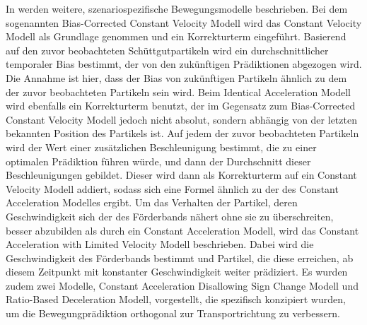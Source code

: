 In \cite{Pfaff2018} werden weitere, szenariospezifische Bewegungsmodelle beschrieben.
Bei dem sogenannten Bias-Corrected Constant Velocity Modell wird das Constant Velocity Modell als Grundlage genommen und ein Korrekturterm eingeführt.
Basierend auf den zuvor beobachteten Schüttgutpartikeln wird ein durchschnittlicher temporaler Bias bestimmt, der von den zukünftigen Prädiktionen abgezogen wird.
Die Annahme ist hier, dass der Bias von zukünftigen Partikeln ähnlich zu dem der zuvor beobachteten Partikeln sein wird.
Beim Identical Acceleration Modell wird ebenfalls ein Korrekturterm benutzt, 
der im Gegensatz zum Bias-Corrected Constant Velocity Modell jedoch nicht absolut, sondern abhängig von der letzten bekannten Position des Partikels ist.
Auf jedem der zuvor beobachteten Partikeln wird der Wert einer zusätzlichen Beschleunigung bestimmt, die zu einer optimalen Prädiktion führen würde,
und dann der Durchschnitt dieser Beschleunigungen gebildet.
Dieser wird dann als Korrekturterm auf ein Constant Velocity Modell addiert, sodass sich eine Formel ähnlich zu der des Constant Acceleration Modelles ergibt.
Um das Verhalten der Partikel, deren Geschwindigkeit sich der des Förderbands nähert ohne sie zu überschreiten, besser abzubilden als durch ein Constant Acceleration Modell,
wird das Constant Acceleration with Limited Velocity Modell beschrieben. 
Dabei wird die Geschwindigkeit des Förderbands bestimmt und Partikel, die diese erreichen, ab diesem Zeitpunkt mit konstanter Geschwindigkeit weiter prädiziert.
Es wurden zudem zwei Modelle, Constant Acceleration Disallowing Sign Change Modell und Ratio-Based Deceleration Modell, vorgestellt, 
die spezifisch konzipiert wurden, um die Bewegungprädiktion orthogonal zur Transportrichtung zu verbessern.

